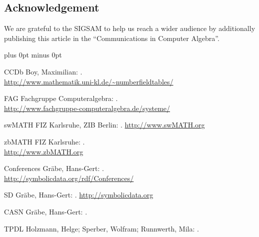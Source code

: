 \documentclass[a4paper,11pt]{article}
\begin{document}
\begin{multicols}{2}
\section*{Acknowledgement}
We are grateful to the SIGSAM to help us reach a
wider audience by additionally publishing this article in the
``Communications in Computer Algebra''.


\begin{thebibliography}{19}
\itemsep=0cm plus 0pt minus 0pt


\bibitem
{CCDb}
Boy, Maximilian:
.\\
\newblock \url{http://www.mathematik.uni-kl.de/~numberfieldtables/}

\bibitem
{FAG}
Fachgruppe Computeralgebra:
.\\
\newblock \url{http://www.fachgruppe-computeralgebra.de/systeme/}

\bibitem
{swMATH}
FIZ Karlsruhe, ZIB Berlin:
.
\newblock \url{http://www.swMATH.org}

\bibitem
{zbMATH}
FIZ Karlsruhe:
.\\
\newblock \url{http://www.zbMATH.org}

\bibitem
{Conferences}
Gr\"abe, Hans-Gert:
.\\
\newblock \url{http://symbolicdata.org/rdf/Conferences/}


\bibitem
{SD}
Gr\"abe, Hans-Gert:
.
\newblock \url{http://symbolicdata.org}

\bibitem
{CASN}
Gr\"abe, Hans-Gert:
.

\bibitem
{TPDL}
Holzmann, Helge; Sperber, Wolfram; Runnwerth, Mila:
.


\end{thebibliography}
\end{multicols}
\end{document}
